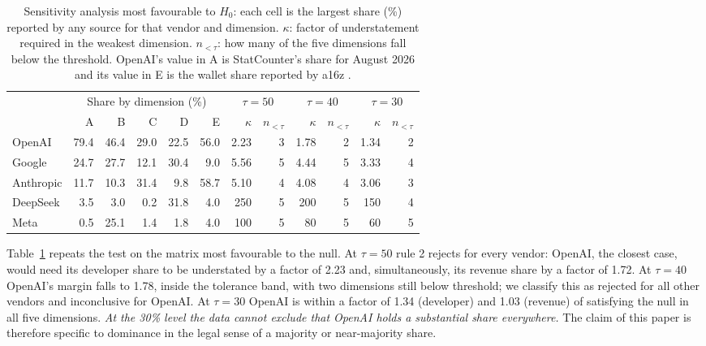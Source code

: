 \documentclass[11pt]{article}
\newcommand{\Hzero}{H_{0}}
\begin{document}
\begin{table}[t]
\centering\small
\caption{Sensitivity analysis most favourable to $\Hzero$: each cell is the largest share (\%) reported by any source for that vendor and dimension. $\kappa$: factor of understatement required in the weakest dimension. $n_{<\tau}$: how many of the five dimensions fall below the threshold. OpenAI's value in A is StatCounter's share for August 2026 \cite{statcounter2026} and its value in E is the wallet share reported by a16z \cite{a16z2026cio}.}
\label{tab:fav}
\begin{tabular}{@{}lrrrrr@{\hspace{1.4em}}rr@{\hspace{1.1em}}rr@{\hspace{1.1em}}rr@{}}
\toprule
& \multicolumn{5}{c}{Share by dimension (\%)}
  & \multicolumn{2}{c}{$\tau=50$} & \multicolumn{2}{c}{$\tau=40$} & \multicolumn{2}{c}{$\tau=30$} \\
\cmidrule(r){2-6}\cmidrule(lr){7-8}\cmidrule(lr){9-10}\cmidrule(l){11-12}
& A & B & C & D & E & $\kappa$ & $n_{<\tau}$ & $\kappa$ & $n_{<\tau}$ & $\kappa$ & $n_{<\tau}$ \\
\midrule
OpenAI & 79.4 & 46.4 & 29.0 & 22.5 & 56.0 & 2.23 & 3 & 1.78 & 2 & 1.34 & 2 \\
Google & 24.7 & 27.7 & 12.1 & 30.4 & 9.0 & 5.56 & 5 & 4.44 & 5 & 3.33 & 4 \\
Anthropic & 11.7 & 10.3 & 31.4 & 9.8 & 58.7 & 5.10 & 4 & 4.08 & 4 & 3.06 & 3 \\
DeepSeek & 3.5 & 3.0 & 0.2 & 31.8 & 4.0 & 250 & 5 & 200 & 5 & 150 & 4 \\
Meta & 0.5 & 25.1 & 1.4 & 1.8 & 4.0 & 100 & 5 & 80 & 5 & 60 & 5 \\
\bottomrule
\end{tabular}
\end{table}

Table~\ref{tab:fav} repeats the test on the matrix most favourable to the null. At $\tau=50$ rule 2 rejects for every vendor: OpenAI, the closest case, would need its developer share to be understated by a factor of 2.23 and, simultaneously, its revenue share by a factor of 1.72. At $\tau=40$ OpenAI's margin falls to 1.78, inside the tolerance band, with two dimensions still below threshold; we classify this as rejected for all other vendors and inconclusive for OpenAI. At $\tau=30$ OpenAI is within a factor of 1.34 (developer) and 1.03 (revenue) of satisfying the null in all five dimensions. \emph{At the 30\% level the data cannot exclude that OpenAI holds a substantial share everywhere.} The claim of this paper is therefore specific to dominance in the legal sense of a majority or near-majority share.
\end{document}
